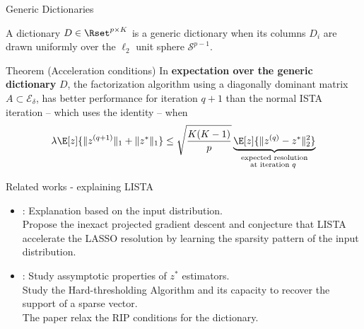 \documentclass[defense.tex]{subfiles}
\begin{document}
\begin{frame}{Generic Dictionaries}
	
	A dictionary $D \in \Rset^{p\times K}$ is a generic dictionary when its columns
	$D_i$ are drawn uniformly over the $\ell_2$ unit sphere $\mathcal S^{p-1}$.

	\begin{block}{Theorem (Acceleration conditions)}
		In \textbf{expectation over the generic dictionary} $D$, the factorization algorithm using a
		diagonally dominant matrix $A\subset\mathcal E_\delta$, has better performance for
		iteration $q+1$ than the normal ISTA iteration -- which uses the identity -- when
		\[
			\lambda\E[z]{\|z^{(q+1)}\|_1+\|z^*\|_1}
				\le \sqrt{\frac{K(K-1)}{p}} \underbrace{\E[z]{\|z^{(q)}-z^*\|_2^2}
				}_{\substack{\text{expected resolution}\\\text{at iteration $q$ }}}
		\]
	\end{block}
\end{frame}

\begin{frame}{Related works - explaining LISTA}

\begin{itemize}\itemsep2em
	\item \cite{Giryes2016}: Explanation based on the input distribution.\\
	Propose the inexact projected gradient descent and conjecture that LISTA
	accelerate the LASSO resolution by learning the sparsity pattern of the
	input distribution.
	\item \cite{xin2016maximal}: Study assymptotic properties of $z^*$ estimators.\\
	 Study the Hard-thresholding Algorithm and its capacity to recover the support
	 of a sparse vector.\\
	The paper relax the RIP conditions for the dictionary.
\end{itemize}
	
\end{frame}
\end{document}
